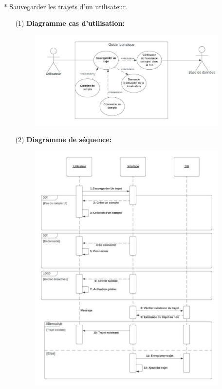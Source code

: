 \documentclass[12pt]{article}
\begin{document}
\newpage
\begin{itemize}
	\item[* ]  Sauvegarder les trajets d’un utilisateur.
	\begin{itemize}
		\item[(1)] \textbf{Diagramme cas d'utilisation:}
	\begin{figure}[!hbtp]
		\centering
		\includegraphics[scale=0.75]{Capture4.PNG}
	\end{figure}
\item[(2)] \textbf{Diagramme de séquence:}
	\begin{figure}[!hbtp]
	\centering
	\includegraphics[scale=0.65]{image1.jpg}
\end{figure}
\end{itemize}
\end{itemize}
\end{document}

